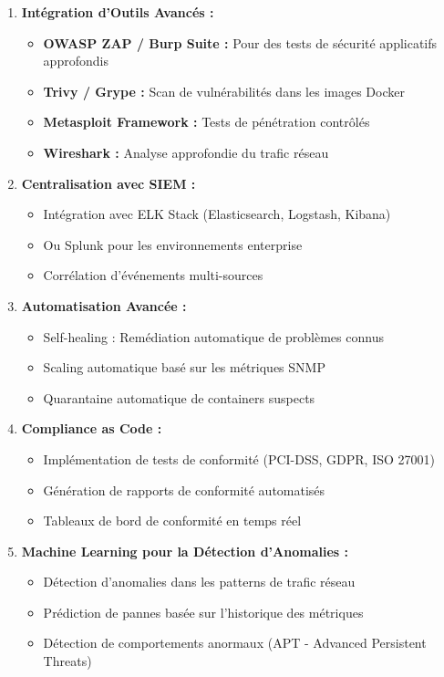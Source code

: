 \begin{enumerate}
    \item \textbf{Intégration d'Outils Avancés :}
    \begin{itemize}
        \item \textbf{OWASP ZAP / Burp Suite :} Pour des tests de sécurité applicatifs approfondis
        \item \textbf{Trivy / Grype :} Scan de vulnérabilités dans les images Docker
        \item \textbf{Metasploit Framework :} Tests de pénétration contrôlés
        \item \textbf{Wireshark :} Analyse approfondie du trafic réseau
    \end{itemize}
    
    \item \textbf{Centralisation avec SIEM :}
    \begin{itemize}
        \item Intégration avec ELK Stack (Elasticsearch, Logstash, Kibana)
        \item Ou Splunk pour les environnements enterprise
        \item Corrélation d'événements multi-sources
    \end{itemize}
    
    \item \textbf{Automatisation Avancée :}
    \begin{itemize}
        \item Self-healing : Remédiation automatique de problèmes connus
        \item Scaling automatique basé sur les métriques SNMP
        \item Quarantaine automatique de containers suspects
    \end{itemize}
    
    \item \textbf{Compliance as Code :}
    \begin{itemize}
        \item Implémentation de tests de conformité (PCI-DSS, GDPR, ISO 27001)
        \item Génération de rapports de conformité automatisés
        \item Tableaux de bord de conformité en temps réel
    \end{itemize}
    
    \item \textbf{Machine Learning pour la Détection d'Anomalies :}
    \begin{itemize}
        \item Détection d'anomalies dans les patterns de trafic réseau
        \item Prédiction de pannes basée sur l'historique des métriques
        \item Détection de comportements anormaux (APT - Advanced Persistent Threats)
    \end{itemize}
\end{enumerate}

